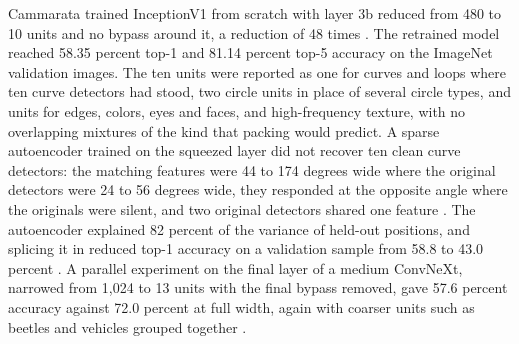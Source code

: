 \documentclass[11pt]{article}
\begin{document}
Cammarata trained InceptionV1 from scratch with layer 3b reduced from 480 to 10 units and no bypass around it, a reduction of 48 times \cite[\emph{What Neurons Do Under Pressure}]{cammarata}. The retrained model reached 58.35 percent top-1 and 81.14 percent top-5 accuracy on the ImageNet validation images. The ten units were reported as one for curves and loops where ten curve detectors had stood, two circle units in place of several circle types, and units for edges, colors, eyes and faces, and high-frequency texture, with no overlapping mixtures of the kind that packing would predict. A sparse autoencoder trained on the squeezed layer did not recover ten clean curve detectors: the matching features were 44 to 174 degrees wide where the original detectors were 24 to 56 degrees wide, they responded at the opposite angle where the originals were silent, and two original detectors shared one feature \cite[\emph{What Neurons Do Under Pressure}, details panel]{cammarata}. The autoencoder explained 82 percent of the variance of held-out positions, and splicing it in reduced top-1 accuracy on a validation sample from 58.8 to 43.0 percent \cite[\emph{What Neurons Do Under Pressure}, details panel]{cammarata}. A parallel experiment on the final layer of a medium ConvNeXt, narrowed from 1,024 to 13 units with the final bypass removed, gave 57.6 percent accuracy against 72.0 percent at full width, again with coarser units such as beetles and vehicles grouped together \cite[\emph{What Neurons Do Under Pressure}]{cammarata}.
\end{document}
